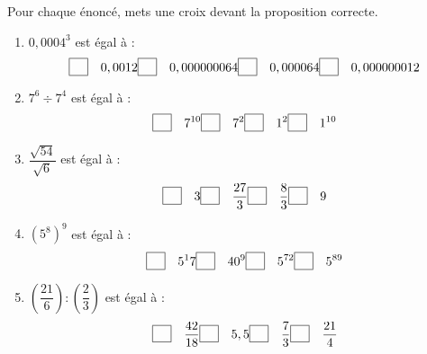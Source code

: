 \medskip

Pour chaque énoncé, mets une croix devant la proposition correcte. 

\begin{enumerate}
\setlength\itemsep{1em}
\fboxsep=1pt
\item $0,0004^3$ est égal à : 
\[\hfill \fbox{\phantom{\checkmark}}\quad 0,0012 \hfill \fbox{\phantom{\checkmark}}\quad 0,000000064 \hfill \fbox{\phantom{\checkmark}}\quad 0,000064 \hfill \fbox{\phantom{\checkmark}}\quad 0,000000012 \hfill\]
\item $7^6\div 7^4$ est égal à : 
\[\hfill \fbox{\phantom{\checkmark}}\quad 7^{10} \hfill \fbox{\phantom{\checkmark}}\quad 7^2 \hfill \fbox{\phantom{\checkmark}}\quad 1^2 \hfill \fbox{\phantom{\checkmark}}\quad 1^{10} \hfill\]
\item $\dfrac{\sqrt{54}}{\sqrt{6}}$ est égal à :
\[\hfill \fbox{\phantom{\checkmark}}\quad 3\hfill \fbox{\phantom{\checkmark}}\quad \dfrac{27}{3} \hfill \fbox{\phantom{\checkmark}}\quad \dfrac{8}{3} \hfill \fbox{\phantom{\checkmark}}\quad 9 \hfill\]
\item $(5^8)^9$ est égal à :
\[\hfill \fbox{\phantom{\checkmark}}\quad 5^17 \hfill \fbox{\phantom{\checkmark}}\quad 40^9 \hfill \fbox{\phantom{\checkmark}}\quad 5^{72} \hfill \fbox{\phantom{\checkmark}}\quad 5^{89} \hfill\]
\item $\left(\dfrac{21}{6}\right):\left(\dfrac{2}{3}\right)$ est égal à :
\[\hfill \fbox{\phantom{\checkmark}}\quad \dfrac{42}{18} \hfill \fbox{\phantom{\checkmark}}\quad 5,5 \hfill \fbox{\phantom{\checkmark}}\quad \dfrac{7}{3} \hfill \fbox{\phantom{\checkmark}}\quad \dfrac{21}{4} \hfill\]
\end{enumerate}
